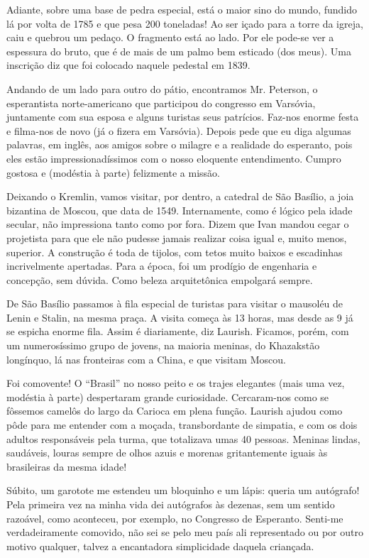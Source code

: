Adiante, sobre uma base de pedra especial, está o maior sino do mundo, fundido lá por volta de 1785 e que pesa 200 toneladas! Ao ser içado para a torre da igreja, caiu e quebrou um pedaço. O fragmento está ao lado. Por ele pode-se ver a espessura do bruto, que é de mais de um palmo bem esticado (dos meus). Uma inscrição diz que foi colocado naquele pedestal em 1839.

Andando de um lado para outro do pátio, encontramos Mr. Peterson, o esperantista norte-americano que participou do congresso em Varsóvia, juntamente com sua esposa e alguns turistas seus patrícios. Faz-nos enorme festa e filma-nos de novo (já o fizera em Varsóvia). Depois pede que eu diga algumas palavras, em inglês, aos amigos sobre o milagre e a realidade do esperanto, pois eles estão impressionadíssimos com o nosso eloquente entendimento. Cumpro gostosa e (modéstia à parte) felizmente a missão.

Deixando o Kremlin, vamos visitar, por dentro, a catedral de São Basílio, a joia bizantina de Moscou, que data de 1549. Internamente, como é lógico pela idade secular, não impressiona tanto como por fora. Dizem que Ivan mandou cegar o projetista para que ele não pudesse jamais realizar coisa igual e, muito menos, superior. A construção é toda de tijolos, com tetos muito baixos e escadinhas incrivelmente apertadas. Para a época, foi um prodígio de engenharia e concepção, sem dúvida. Como beleza arquitetônica empolgará sempre.

De São Basílio passamos à fila especial de turistas para visitar o mausoléu de Lenin e Stalin, na mesma praça. A visita começa às 13 horas, mas desde as 9 já se espicha enorme fila. Assim é diariamente, diz Laurish. Ficamos, porém, com um numerosíssimo grupo de jovens, na maioria meninas, do Khazakstão longínquo, lá nas fronteiras com a China, e que visitam Moscou.

Foi comovente! O ``Brasil'' no nosso peito e os trajes elegantes (mais uma vez, modéstia à parte) despertaram grande curiosidade. Cercaram-nos como se fôssemos camelôs do largo da Carioca em plena função. Laurish ajudou como pôde para me entender com a moçada, transbordante de simpatia, e com os dois adultos responsáveis pela turma, que totalizava umas 40 pessoas. Meninas lindas, saudáveis, louras sempre de olhos azuis e morenas gritantemente iguais às brasileiras da mesma idade!

Súbito, um garotote me estendeu um bloquinho e um lápis: queria um autógrafo! Pela primeira vez na minha vida dei autógrafos às dezenas, sem um sentido razoável, como aconteceu, por exemplo, no Congresso de Esperanto. Senti-me verdadeiramente comovido, não sei se pelo meu país ali representado ou por outro motivo qualquer, talvez a encantadora simplicidade daquela criançada.


